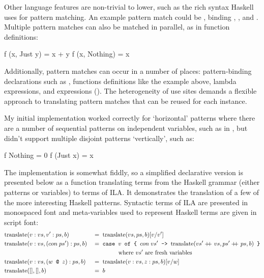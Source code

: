 \documentclass[dissertation.tex]{subfiles}
\begin{document}
{{{            Other language features are non-trivial to lower, such as the rich syntax Haskell uses for pattern matching. An example pattern match could be , binding , , and . Multiple pattern matches can also be matched in parallel, as in function definitions:

            \begin{haskellfigure}
            f (x, Just y) = x + y
            f (x, Nothing) = x
            \end{haskellfigure}

            Additionally, pattern matches can occur in a number of places: pattern-binding declarations such as , functions definitions like the example above, lambda expressions, and  expressions (). The heterogeneity of use sites demands a flexible approach to translating pattern matches that can be reused for each instance.

            My initial implementation worked correctly for `horizontal' patterns where there are a number of sequential patterns on independent variables, such as in , but didn't support multiple disjoint patterns `vertically', such as:

            \begin{haskellfigure}
            f Nothing = 0
            f (Just x) = x
            \end{haskellfigure}

            The implementation is somewhat fiddly, so a simplified declarative version is presented below as a function translating terms from the Haskell grammar (either patterns or variables) to terms of ILA. It demonstrates the translation of a few of the more interesting Haskell patterns. Syntactic terms of ILA are presented in monospaced font and meta-variables used to represent Haskell terms are given in script font:
            \begin{alignat*}{2}
            \text{translate} & (v:vs, v':ps, b) && =\; \text{translate} (vs, ps, b) [v/v'] \\
            \text{translate} & (v:vs, (con\;ps'):ps, b) && =\; \texttt{case } v \texttt{ of \{ }con\;vs'\texttt{ -> }
            \text{translate} (vs' +\kern-1.3ex+\kern0.8ex vs, ps' +\kern-1.3ex+\kern0.8ex ps, b) \texttt{ \}} \\
            & && \hspace{1.5cm}\text{where } vs' \text{ are fresh variables} \\
            \text{translate} & (v:vs, (w \texttt{ @ } z):ps, b) && =\; \text{translate} (v:vs, z:ps, b) [v/w] \\
            \text{translate} & ([], [], b) && =\; b
            \end{alignat*}

}}}
\end{document}
